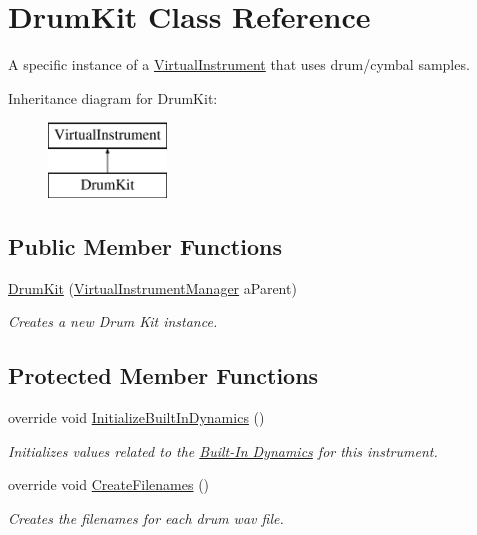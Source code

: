 \hypertarget{class_drum_kit}{}\section{Drum\+Kit Class Reference}
\label{class_drum_kit}


A specific instance of a \hyperlink{class_virtual_instrument}{Virtual\+Instrument} that uses drum/cymbal samples.  


Inheritance diagram for Drum\+Kit\+:\begin{figure}[H]
\begin{center}
\leavevmode
\includegraphics[height=2.000000cm]{class_drum_kit}
\end{center}
\end{figure}
\subsection*{Public Member Functions}
\begin{DoxyCompactItemize}
\item 
\hyperlink{group___drum_construct_gabade574e7f9d5684653c0b33524362a7}{Drum\+Kit} (\hyperlink{class_virtual_instrument_manager}{Virtual\+Instrument\+Manager} a\+Parent)
\begin{DoxyCompactList}\small\item\em Creates a new Drum Kit instance. \end{DoxyCompactList}\end{DoxyCompactItemize}
\subsection*{Protected Member Functions}
\begin{DoxyCompactItemize}
\item 
override void \hyperlink{group___drum_virt_func_gad14c6155e6ec62f26a30261e273d6379}{Initialize\+Built\+In\+Dynamics} ()
\begin{DoxyCompactList}\small\item\em Initializes values related to the \hyperlink{group___audio_DefBID}{Built-\/\+In Dynamics} for this instrument. \end{DoxyCompactList}\item 
override void \hyperlink{group___drum_virt_func_ga25bb92cf56bc1b3434465faf73cd09cf}{Create\+Filenames} ()
\begin{DoxyCompactList}\small\item\em Creates the filenames for each drum wav file. \end{DoxyCompactList}\end{DoxyCompactItemize}
